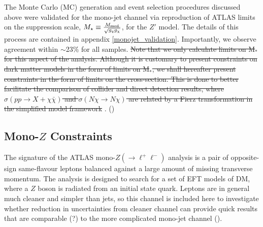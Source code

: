 The Monte Carlo (MC) generation and event selection procedures discussed above were validated for the mono-jet channel via reproduction of ATLAS limits on the suppression scale, $M_{\star} \equiv \frac{M_{\mathrm{med}}}{\sqrt{g_q g_{\chi}}}$, for the $Z'$ model. The details of this process are contained in appendix \ref{monojet_validation}. Importantly, we observe agreement within $\sim$23\% for all samples. 
\st{Note that we only calculate limits on M$_{*}$ for this aspect of the analysis. Although it is customary to present constraints on dark matter models in the form of limits on M$_{*}$, we shall hereafter present constraints in the form of limits on the cross-section. This is done to better facilitate the comparison of collider and direct detection results, where $\sigma(pp \rightarrow X + \chi\bar{\chi})$ and $\sigma(N\chi \rightarrow N\chi)$ are related by a Fierz transformation in the simplified model framework} \cite{PJFox, NBellDent}. () 

\subsection{Mono-$Z$ Constraints}
\label{monoZ_constraints}
The signature of the ATLAS mono-$Z(\rightarrow \ell^+ \ell^-)$ analysis \cite{Aad:2014monoZlep} is a pair of opposite-sign same-flavour leptons balanced against a large amount of missing transverse momentum. The analysis is designed to search for a set of EFT models of DM, where a $Z$ boson is radiated from an initial state quark. Leptons are in general much cleaner and simpler than jets, so this channel is included here to investigate whether reduction in uncertainties from cleaner channel can provide quick results that are comparable (?) to the more complicated mono-jet channel (). 

